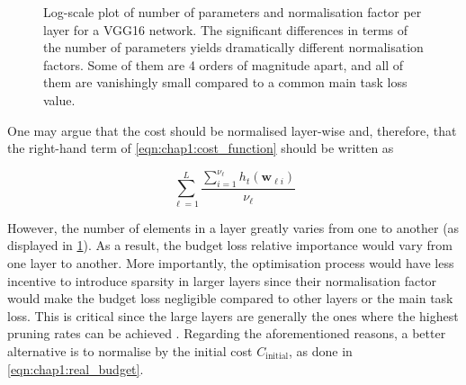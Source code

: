 \begin{figure}
  \centering
    \caption{ Log-scale plot of
    number of parameters and normalisation factor per layer for a VGG16
    network. The significant differences in terms of the number of parameters
    yields dramatically different normalisation factors. Some of them are 4
    orders of magnitude apart, and all of them are vanishingly small compared
    to a common main task loss value.}
  \label{fig:chap1:vgg16_per_layer_param_and_norm_factor}
\end{figure}

One may argue that the cost should be normalised layer-wise and, therefore,
that the right-hand term of \cref{eqn:chap1:cost_function} should be written as

$$\displaystyle\sum_{\ell=1}^{L}\frac{\displaystyle \sum_{i=1}^{\nu_\ell}
    h_t(\mathbf{w}_{\ell i})}{\nu_\ell}$$

However, the number of elements in a layer greatly varies from one to another
(as displayed in \cref{fig:chap1:vgg16_per_layer_param_and_norm_factor}). As a
result,  the budget loss relative importance would vary from one layer to
another. More importantly, the optimisation process would have less incentive to
introduce sparsity in larger layers since their normalisation factor would make
the budget loss negligible compared to other layers or the main task loss. This
is critical since the large layers are generally the ones where the highest
pruning rates can be achieved \cite{DBLP:journals/corr/abs-2202-12002}.
Regarding the aforementioned reasons, a better alternative is to normalise by
the initial cost $C_\text{initial}$, as done in \cref{eqn:chap1:real_budget}.\\

